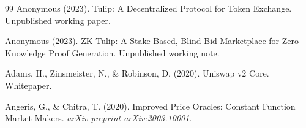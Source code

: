 \begin{thebibliography}{99}
   Anonymous (2023). Tulip: A Decentralized Protocol for
    Token Exchange. Unpublished working paper.

   Anonymous (2023). ZK-Tulip: A Stake-Based, Blind-Bid
    Marketplace for Zero-Knowledge Proof Generation. Unpublished working
    note.

   Adams, H., Zinsmeister, N., \& Robinson, D.
    (2020). Uniswap v2 Core. Whitepaper.

   Angeris, G., \& Chitra, T. (2020). Improved
    Price Oracles: Constant Function Market Makers.
    \textit{arXiv preprint arXiv:2003.10001}.
\end{thebibliography}
